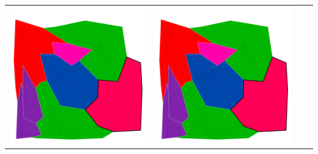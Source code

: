 \documentclass[10pt,a4paper]{article}
\begin{document}
\begin{tabular}{c c c c }
	\includegraphics[scale=.10]{../results/backtracking_forward/map_build/bt_forward_I00009.pdf}&
	\includegraphics[scale=.10]{../results/backtracking_forward/map_build/bt_forward_I00010.pdf}&

\end{tabular}
\end{document}
